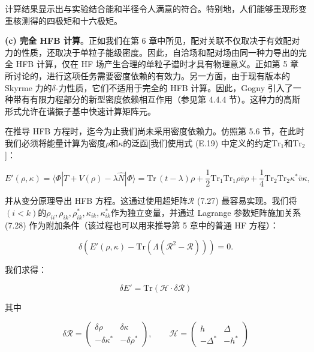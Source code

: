 计算结果显示出与实验结合能和半径令人满意的符合。特别地，人们能够重现形变重核测得的四极矩和十六极矩\cite{FQV73}。

\noindent\textbf{(c) 完全 HFB 计算}。正如我们在第 6 章中所见，配对关联不仅取决于有效配对力的性质，还取决于单粒子能级密度。因此，自洽场和配对场由同一种力导出的完全
HFB 计算，仅在 HF 场产生合理的单粒子谱时才具有物理意义。正如第 5 章所讨论的，进行这项任务需要密度依赖的有效力。另一方面，由于现有版本的
Skyrme 力的$\delta$-力性质，它们不适用于完全的 HFB 计算。因此，Gogny \cite{Go73,Go75b,DGG75,DG80}
引入了一种带有有限力程部分的新型密度依赖相互作用（参见第 4.4.4 节）。这种力的高斯形式允许在谐振子基中快速计算矩阵元\cite{Go75a}。

在推导 HFB 方程时，迄今为止我们尚未采用密度依赖力。仿照第 5.6 节，在此时我们必须将能量计算为密度$\rho$和$\kappa$的泛函{[}我们使用式
(E.19) 中定义的约定$\mathrm{Tr}_{1}$和$\mathrm{Tr}_{2}${]}：

\begin{equation}
E'(\rho,\kappa)=\langle\Phi|T+V(\rho)-\lambda\hat{N}|\Phi\rangle=\mathrm{Tr}\,(t-\lambda)\rho+\frac{1}{2}\mathrm{Tr}_{1}\mathrm{Tr}_{1}\rho\bar{v}\rho+\frac{1}{4}\mathrm{Tr}_{2}\mathrm{Tr}_{2}\kappa^{*}\bar{v}\kappa,\label{eq:energy_functional_hfb_density_dep}
\end{equation}

并从变分原理导出 HFB 方程。这通过使用超矩阵$\mathcal{R}$ (7.27) 最容易实现。我们将$(i<k)$的$\rho_{ii},\rho_{ik},\rho^{*}_{ik},\kappa_{ik},\kappa^{*}_{ik}$作为独立变量，并通过
Lagrange 参数矩阵施加关系 (7.28) 作为附加条件（该过程也可以用来推导第 5 章中的普通 HF 方程）：

\begin{equation}
\delta\left(E'(\rho,\kappa)-\mathrm{Tr}(\Lambda(\mathcal{R}^{2}-\mathcal{R}))\right)=0.\label{eq:variational_principle_lagrange_R}
\end{equation}

我们求得：

\begin{equation}
\delta E'=\mathrm{Tr}(\mathcal{H}\cdot\delta\mathcal{R})\label{eq:delta_E_prime}
\end{equation}

其中

\begin{equation}
\delta\mathcal{R}=\begin{pmatrix}\delta\rho & \delta\kappa\\
-\delta\kappa^{*} & -\delta\rho^{*}
\end{pmatrix},\qquad\mathcal{H}=\begin{pmatrix}h & \Delta\\
-\Delta^{*} & -h^{*}
\end{pmatrix}\label{eq:delta_R_supermatrix}
\end{equation}

